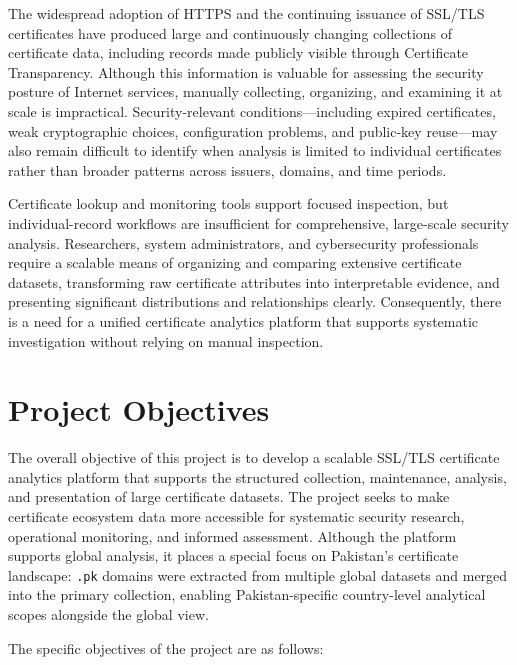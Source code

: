 The widespread adoption of HTTPS and the continuing issuance of SSL/TLS
certificates have produced large and continuously changing collections of
certificate data, including records made publicly visible through Certificate
Transparency. Although this information is valuable for assessing the security
posture of Internet services, manually collecting, organizing, and examining it
at scale is impractical. Security-relevant conditions---including expired
certificates, weak cryptographic choices, configuration problems, and public-key
reuse---may also remain difficult to identify when analysis is limited to
individual certificates rather than broader patterns across issuers, domains,
and time periods.

Certificate lookup and monitoring tools support focused inspection, but
individual-record workflows are insufficient for comprehensive, large-scale
security analysis. Researchers, system administrators, and cybersecurity
professionals require a scalable means of organizing and comparing extensive
certificate datasets, transforming raw certificate attributes into
interpretable evidence, and presenting significant distributions and
relationships clearly. Consequently, there is a need for a unified certificate
analytics platform that supports systematic investigation without relying on
manual inspection.

\section{Project Objectives}
\label{sec:objectives}

The overall objective of this project is to develop a scalable SSL/TLS
certificate analytics platform that supports the structured collection,
maintenance, analysis, and presentation of large certificate datasets. The
project seeks to make certificate ecosystem data more accessible for systematic
security research, operational monitoring, and informed assessment. Although the
platform supports global analysis, it places a special focus on Pakistan's
certificate landscape: \texttt{.pk} domains were extracted from multiple global
datasets and merged into the primary collection, enabling Pakistan-specific
country-level analytical scopes alongside the global view.

The specific objectives of the project are as follows:

